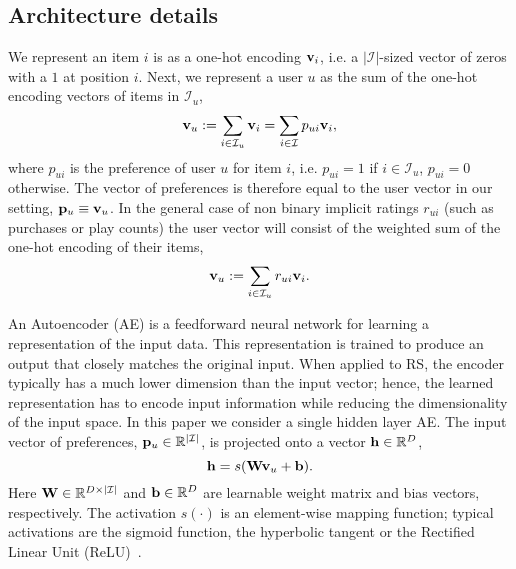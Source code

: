 \subsection{Architecture details}\label{subsec:architecture}
We represent an  item $i$ is as a one-hot encoding ${\bf v}_i$, i.e. a $|\mathcal{I}|$-sized vector of zeros with a 
$1$ at position $i$. 
Next, we represent a user $u$ as the sum of the one-hot encoding vectors of items in $\mathcal{I}_u$,
\begin{equation}\label{eq:user_input}
{\bf v}_u: =\sum_{i\in\mathcal{I}_u}{\bf v}_i = \sum_{i\in\mathcal{I}}p_{ui}{\bf v}_i,
\end{equation}
where $p_{ui}$ is the preference of user $u$ for item $i$, i.e. $p_{ui}=1$ if $i\in\mathcal{I}_u$, $p_{ui}=0$ otherwise.
The vector of preferences is therefore equal to the user vector in our setting, ${\bf p}_u\equiv {\bf v}_u$.
In the general case of non binary implicit ratings $r_{ui}$ (such as purchases or play counts) 
the user vector will consist of the weighted sum of the one-hot encoding of their items,
\begin{equation}\label{eq:user_input_weighted}
{\bf v}_u: =\sum_{i\in\mathcal{I}_u}r_{ui}{\bf v}_i.
\end{equation}

An Autoencoder (AE) \cite{Kramer:1991:NLPCA} is a feedforward neural network for learning a representation 
of the input data. This representation is trained to produce an output that closely matches the original input. 
When applied to RS, the encoder typically has  a much lower dimension than the input vector; 
hence, the learned representation has to encode input information while reducing the dimensionality of the input space. 
In this paper we consider a single hidden layer AE.
The input vector of preferences, ${\bf p}_u\in\mathbb{R}^{|\mathcal{I}|}$, is projected onto a vector ${\bf h}\in\mathbb{R}^D$,
\begin{equation}\label{eq:AE_hidden}
{\bf h} = s({\bf W}{\bf v}_u+{\bf b}).
\end{equation}
Here ${\bf W}\in\mathbb{R}^{D\times|\mathcal{I}|}$  and ${\bf b}\in\mathbb{R}^D$ are learnable weight matrix and bias vectors, respectively. 
The activation $s(\cdot)$ is an element-wise mapping function; typical activations are the sigmoid function, the hyperbolic tangent or
the Rectified Linear Unit (ReLU)~\cite{icml2010_NairH10_Relu}. %

